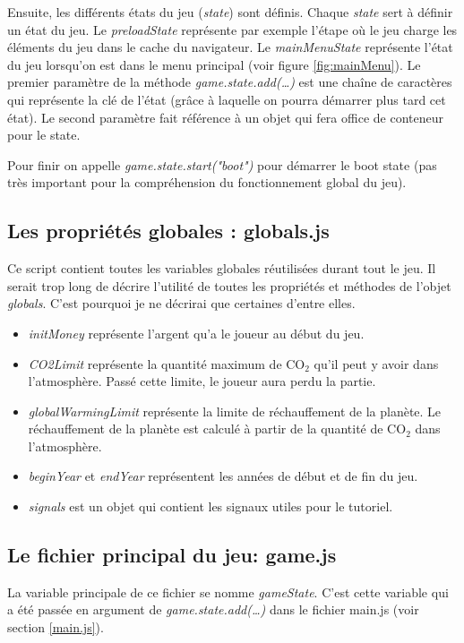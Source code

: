 \documentclass{article}
\begin{document}
		
		Ensuite, les différents états du jeu (\textit{state}) sont définis. Chaque \textit{state} sert à définir un état du jeu. Le \textit{preloadState} représente par exemple l'étape où le jeu charge les éléments du jeu dans le cache du navigateur.
		Le \textit{mainMenuState} représente l'état du jeu lorsqu'on est dans le menu principal (voir figure \ref{fig:mainMenu}).
		Le premier paramètre de la méthode \textit{game.state.add(\dots)} est une chaîne de caractères qui représente la clé de l'état (grâce à laquelle on pourra démarrer plus tard cet état). Le second paramètre fait référence à un objet qui fera office de conteneur pour le state.
		
		
		Pour finir on appelle \textit{game.state.start("boot")} pour démarrer le boot state (pas très important pour la compréhension du fonctionnement global du jeu).
		
		\subsection{Les propriétés globales : globals.js} \label{globals.js}
		
		Ce script contient toutes les variables globales réutilisées durant tout le jeu. Il serait trop long de décrire l'utilité de toutes les propriétés et méthodes de l'objet \textit{globals}. C'est pourquoi je ne décrirai que certaines d'entre elles.
		
		\begin{itemize}
			\item \textit{initMoney} représente l'argent qu'a le joueur au début du jeu.
			\item \textit{CO2Limit} représente la quantité maximum de CO$_{2}$ qu'il peut y avoir dans l'atmosphère. Passé cette limite, le joueur aura perdu la partie.
			\item \textit{globalWarmingLimit} représente la limite de réchauffement de la planète. Le réchauffement de la planète est calculé à partir de la quantité de CO$_{2}$ dans l'atmosphère.
			\item \textit{beginYear} et \textit{endYear} représentent les années de début et de fin du jeu.
			\item \textit{signals} est un objet qui contient les signaux utiles pour le tutoriel.
		\end{itemize}
		
		\subsection{Le fichier principal du jeu: game.js}
		
		La variable principale de ce fichier se nomme \textit{gameState}. C'est cette variable qui a été passée en argument de \textit{game.state.add(\dots)} dans le fichier main.js (voir section \ref{main.js}).
		
\end{document}
